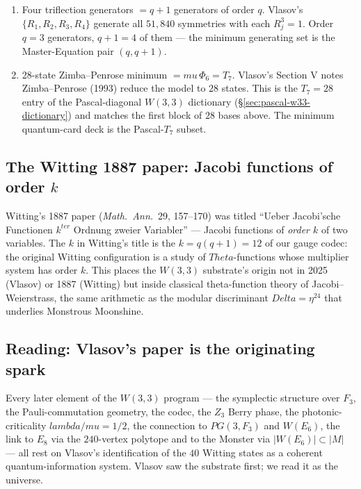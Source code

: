 \documentclass[11pt]{article}
\def\mathbb#1{#1}%
\def\mathrm#1{#1}%
\def\mathbf#1{#1}%
\def\textbf#1{#1}%
\def\text#1{#1}%
\def\Delta{Delta}%
\def\lambda{lambda}%
\def\mu{mu}%
\def\Phi#1{Phi#1}%
\def\Theta{Theta}%
\begin{document}
\begin{enumerate}[leftmargin=2em]
\item \textbf{Four triflection generators $= q+1$ generators of order $q$.} Vlasov's $\{R_1, R_2, R_3, R_4\}$ generate all $51{,}840$ symmetries with each $R_j^3 = \mathbf{1}$. Order $q = 3$ generators, $q+1 = 4$ of them --- the minimum generating set is the Master-Equation pair $(q, q+1)$.

\item \textbf{28-state Zimba--Penrose minimum $= \mu\,\Phi_6 = T_7$.} Vlasov's Section V notes Zimba--Penrose (1993) reduce the model to $28$ states. This is the $T_7 = 28$ entry of the Pascal-diagonal $W(3,3)$ dictionary (\S\ref{sec:pascal-w33-dictionary}) and matches the first block of $28$ bases above. The minimum quantum-card deck is the Pascal-$T_7$ subset.
\end{enumerate}

\subsection*{The Witting 1887 paper: Jacobi functions of order $k$}

Witting's 1887 paper (\emph{Math.\ Ann.}\ \textbf{29}, 157--170) was titled ``Ueber Jacobi'sche Functionen $k^{\text{ter}}$ Ordnung zweier Variabler'' --- Jacobi functions of \emph{order $k$} of two variables. The $k$ in Witting's title is the $k = q(q+1) = 12$ of our gauge codec: the original Witting configuration is a study of $\Theta$-functions whose multiplier system has order $k$. This places the $W(3,3)$ substrate's origin not in 2025 (Vlasov) or 1887 (Witting) but inside classical theta-function theory of Jacobi--Weierstrass, the same arithmetic as the modular discriminant $\Delta = \eta^{24}$ that underlies Monstrous Moonshine.

\subsection*{Reading: Vlasov's paper is the originating spark}

Every later element of the $W(3,3)$ program --- the symplectic structure over $\mathbb{F}_3$, the Pauli-commutation geometry, the codec, the $\mathbb{Z}_3$ Berry phase, the photonic-criticality $\lambda/\mu = 1/2$, the connection to $\mathrm{PG}(3, \mathbb{F}_3)$ and $W(E_6)$, the link to $E_8$ via the $240$-vertex polytope and to the Monster via $|W(E_6)| \subset |\mathbb{M}|$ --- all rest on Vlasov's identification of the $40$ Witting states as a coherent quantum-information system. \textbf{Vlasov saw the substrate first; we read it as the universe.}
\end{document}
